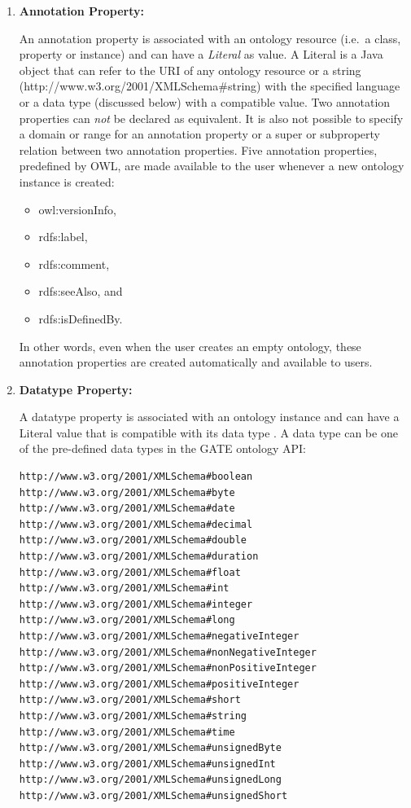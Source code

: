 \begin{enumerate}
\item \textbf{Annotation Property:}

An annotation property is associated with an ontology resource (i.e.~a
class, property or instance) and can have a \emph{Literal} as
value. A Literal is a Java object that can refer to the URI of any
ontology resource or a string
(http://www.w3.org/2001/XMLSchema\#string) with the specified language
or a data type (discussed below) with a compatible value. Two
annotation properties can \emph{not} be declared as equivalent. It is also not
possible to specify a domain or range for an annotation property or a
super or subproperty relation between two annotation properties. Five
annotation properties, predefined by OWL, are made available to the user
whenever a new ontology instance is created: 
\begin{itemize}
 \item owl:versionInfo,
 \item rdfs:label,
 \item rdfs:comment,
 \item rdfs:seeAlso, and 
  \item rdfs:isDefinedBy. 
\end{itemize}
In other
words, even when the user creates an empty ontology, these annotation
properties are created automatically and available to users.

\item \textbf{Datatype Property:}

A datatype property is associated with an ontology instance and can
have a Literal value that is compatible with its data type . 
A data type can be one of
the pre-defined data types in the GATE ontology API:

\begin{small}\begin{verbatim}
http://www.w3.org/2001/XMLSchema#boolean
http://www.w3.org/2001/XMLSchema#byte
http://www.w3.org/2001/XMLSchema#date
http://www.w3.org/2001/XMLSchema#decimal
http://www.w3.org/2001/XMLSchema#double
http://www.w3.org/2001/XMLSchema#duration
http://www.w3.org/2001/XMLSchema#float
http://www.w3.org/2001/XMLSchema#int
http://www.w3.org/2001/XMLSchema#integer
http://www.w3.org/2001/XMLSchema#long
http://www.w3.org/2001/XMLSchema#negativeInteger
http://www.w3.org/2001/XMLSchema#nonNegativeInteger
http://www.w3.org/2001/XMLSchema#nonPositiveInteger
http://www.w3.org/2001/XMLSchema#positiveInteger
http://www.w3.org/2001/XMLSchema#short
http://www.w3.org/2001/XMLSchema#string
http://www.w3.org/2001/XMLSchema#time
http://www.w3.org/2001/XMLSchema#unsignedByte
http://www.w3.org/2001/XMLSchema#unsignedInt
http://www.w3.org/2001/XMLSchema#unsignedLong
http://www.w3.org/2001/XMLSchema#unsignedShort
\end{verbatim}\end{small}


\end{enumerate}
